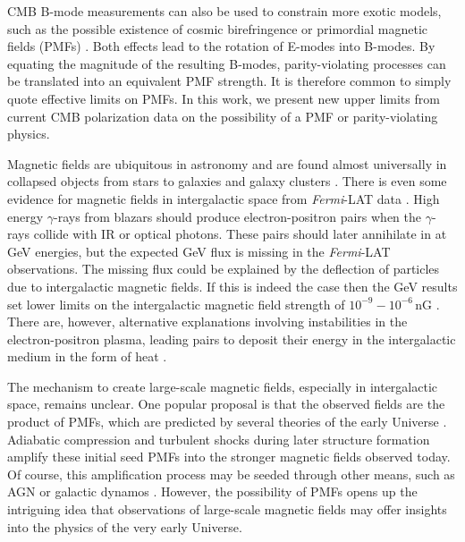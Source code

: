 \documentclass[apj]{emulateapj}
\newcommand{\fermilat}{\textit{Fermi}-LAT}
\begin{document}
CMB B-mode measurements can also be used to constrain more exotic models, such as the possible existence of cosmic birefringence \citep{carroll98,lue99} or primordial magnetic fields (PMFs) \citep{kosowsky96, seshadri01}.  
Both effects lead to the rotation of E-modes into B-modes. 
By equating the magnitude of the resulting B-modes, parity-violating processes can be translated into an equivalent PMF strength. 
It is therefore common to simply quote effective limits on PMFs. 
In this work, we present new upper limits from current CMB polarization data on the possibility of a PMF or parity-violating physics. 

Magnetic fields are ubiquitous in astronomy and are found almost universally in collapsed objects from stars to galaxies and galaxy clusters \citep[for a review, see][]{ryu12, widrow12}. 
There is even some evidence for magnetic fields in intergalactic space from \fermilat{} data \citep{neronov10}.
High energy $\gamma$-rays from blazars should  produce electron-positron pairs when the $\gamma$-rays collide with IR or optical photons. 
These pairs should later annihilate in at GeV energies, but the expected GeV flux is missing in the \fermilat{} observations. 
The missing flux could be explained by the deflection of particles due to intergalactic magnetic fields. 
If this is indeed the case then the GeV results set lower limits on the intergalactic magnetic field strength of $10^{-9} - 10^{-6}$\,nG \citep{tavecchio10,taylor11,dermer11,vovk12}.
There are, however, alternative explanations involving instabilities in the electron-positron plasma, leading pairs to deposit their energy in the intergalactic medium in the form of heat \citep{broderick12}.


The mechanism to create large-scale magnetic fields, especially in intergalactic space, remains unclear. 
One popular proposal is that the observed fields are the product of PMFs, which are predicted by several theories of the early Universe \citep[e.g.,][]{turner88, grasso98,ichiki06}. 
Adiabatic compression and turbulent shocks during later structure formation amplify these initial seed PMFs into the stronger magnetic fields observed today. 
Of course, this amplification process may be seeded through other means, such as AGN or galactic dynamos \citep[for a review, see][]{giovannini04}. 
However, the possibility of PMFs opens up the intriguing idea that observations of large-scale magnetic fields may offer insights into the physics of the very early Universe. 
\end{document}

